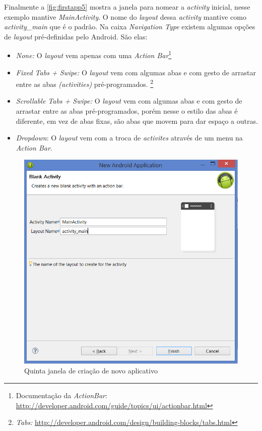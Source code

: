 \documentclass[a4paper,12pt,brazil,oneside]{book}
\begin{document}
\begin{singlespace}
Finalmente a \autoref{fig:firstapp5} mostra a janela para nomear a \emph{activity} inicial, nesse exemplo mantive \emph{MainActivity}. O nome do \emph{layout} dessa \emph{activity} mantive como \emph{activity\_main} que é o padrão. Na caixa \emph{Navigation Type} existem algumas opções de \emph{layout} pré-definidas pelo Android. São elas:
\begin{itemize}
\item
	\emph{None:} O \emph{layout} vem apenas com uma \emph{Action Bar}\footnote{Documentação da \emph{ActionBar}: \href{http://developer.android.com/guide/topics/ui/actionbar.html}{http://developer.android.com/guide/topics/ui/actionbar.html}}
\item
	\emph{Fixed Tabs + Swipe:} O \emph{layout} vem com algumas abas e com gesto de arrastar entre as abas \emph{(activities)} pré-programados.
	\footnote{\emph{Tabs:} \href{http://developer.android.com/design/building-blocks/tabs.html}{http://developer.android.com/design/building-blocks/tabs.html}}
\item
	\emph{Scrollable Tabs + Swipe:} O \emph{layout} vem com algumas abas e com gesto de arrastar entre as abas pré-programados, porém nesse o estilo das abas é diferente, em vez de abas fixas, são abas que movem para dar espaço a outras. 
\item
	\emph{Dropdown}: O \emph{layout} vem com a troca de \emph{activites} através de um menu na \emph{Action Bar}.  
\end{itemize}


\begin{figure}[H]
  \centering
  \includegraphics[width=.75\textwidth]{figuras/firstapp/firstapp5.png}
  \caption{Quinta janela de criação de novo aplicativo}
  \label{fig:firstapp5}
\end{figure}



\end{singlespace}
\end{document}
